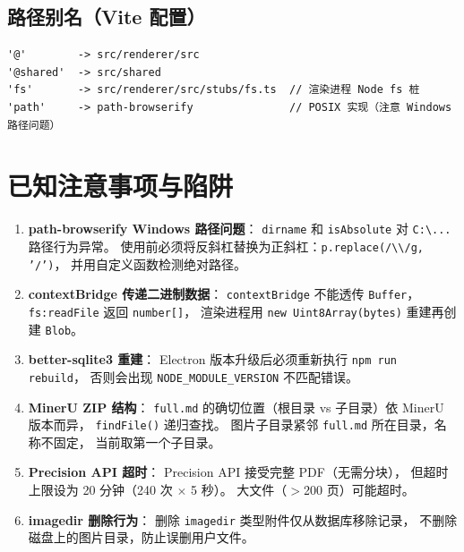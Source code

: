 \documentclass[12pt, a4paper]{article}
\begin{document}
\subsection{路径别名（Vite 配置）}

\begin{lstlisting}[language={}, numbers=none]
'@'        -> src/renderer/src
'@shared'  -> src/shared
'fs'       -> src/renderer/src/stubs/fs.ts  // 渲染进程 Node fs 桩
'path'     -> path-browserify               // POSIX 实现（注意 Windows 路径问题）
\end{lstlisting}

\section{已知注意事项与陷阱}

\begin{enumerate}[leftmargin=2em, itemsep=4pt]
  \item \textbf{path-browserify Windows 路径问题}：
        \texttt{dirname} 和 \texttt{isAbsolute} 对 \texttt{C:\textbackslash...} 路径行为异常。
        使用前必须将反斜杠替换为正斜杠：\texttt{p.replace(/\textbackslash\textbackslash/g, '/')}，
        并用自定义函数检测绝对路径。

  \item \textbf{contextBridge 传递二进制数据}：
        \texttt{contextBridge} 不能透传 \texttt{Buffer}，
        \texttt{fs:readFile} 返回 \texttt{number[]}，
        渲染进程用 \texttt{new Uint8Array(bytes)} 重建再创建 \texttt{Blob}。

  \item \textbf{better-sqlite3 重建}：
        Electron 版本升级后必须重新执行 \texttt{npm run rebuild}，
        否则会出现 \texttt{NODE\_MODULE\_VERSION} 不匹配错误。

  \item \textbf{MinerU ZIP 结构}：
        \texttt{full.md} 的确切位置（根目录 vs 子目录）依 MinerU 版本而异，
        \texttt{findFile()} 递归查找。
        图片子目录紧邻 \texttt{full.md} 所在目录，名称不固定，
        当前取第一个子目录。

  \item \textbf{Precision API 超时}：
        Precision API 接受完整 PDF（无需分块），
        但超时上限设为 20 分钟（240 次 $\times$ 5 秒）。
        大文件（$>$200 页）可能超时。

  \item \textbf{imagedir 删除行为}：
        删除 \texttt{imagedir} 类型附件仅从数据库移除记录，
        不删除磁盘上的图片目录，防止误删用户文件。
\end{enumerate}
\end{document}
